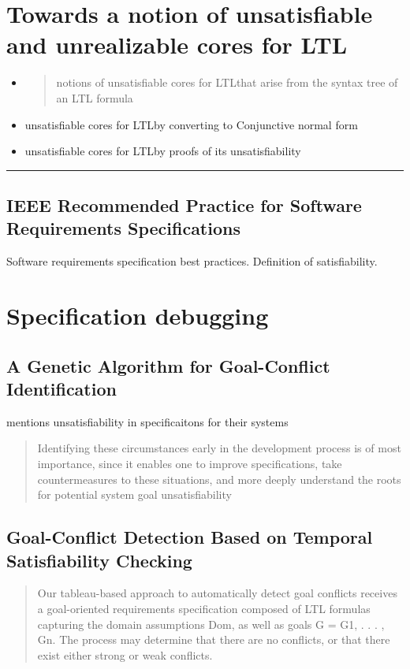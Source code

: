 \documentclass{article}
\newcommand\ltl{{LTL}}
\begin{document}
\section*{Towards a notion of unsatisfiable and unrealizable cores for LTL \cite{schuppan_towards_2012}}
\begin{itemize}
    \item \begin{quote}
        notions of unsatisfiable cores for \ltl that arise from the syntax tree of an LTL formula
    \end{quote}
    \item unsatisfiable cores for \ltl by converting to Conjunctive normal form
    \item unsatisfiable cores for \ltl by proofs of its unsatisfiability
\end{itemize}


\noindent\rule[7pt]{\linewidth}{0.4pt}



\subsection*{IEEE Recommended Practice for Software Requirements Specifications \cite{standards2016ieee}}
Software requirements specification best practices.
Definition of satisfiability.

\section*{Specification debugging}
\subsection*{A Genetic Algorithm for Goal-Conflict Identification \cite{degiovanni2018genetic}}
mentions unsatisfiability in specificaitons for their systems
\begin{quote}
    Identifying
these circumstances early in the development process is of most
importance, since it enables one to improve specifications, take
countermeasures to these situations, and more deeply understand
the roots for potential system goal unsatisfiability
\end{quote}

\subsection*{Goal-Conflict Detection Based on Temporal Satisfiability Checking \cite{degiovanni2016goal}}
\begin{quote}
    Our tableau-based approach to automatically detect goal
conflicts receives a goal-oriented requirements specification
composed of LTL formulas capturing the domain assumptions
Dom, as well as goals G = {G1, . . . , Gn}. The process may
determine that there are no conflicts, or that there exist
either strong or weak conflicts. 
\end{quote}
\end{document}

